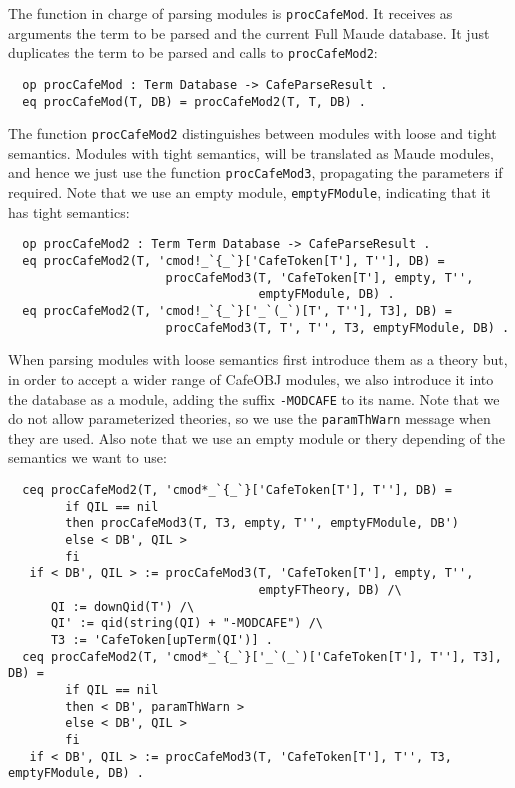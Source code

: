The function in charge of parsing modules is \verb"procCafeMod". It receives as
arguments the term to be parsed and the current Full Maude database. It just duplicates
the term to be parsed and calls to \verb"procCafeMod2":

{\codesize
\begin{verbatim}
  op procCafeMod : Term Database -> CafeParseResult .
  eq procCafeMod(T, DB) = procCafeMod2(T, T, DB) .
\end{verbatim}
}

The function \verb"procCafeMod2" distinguishes between modules with loose and
tight semantics. Modules with tight semantics, will be translated as Maude modules,
and hence we just use the function \verb"procCafeMod3", propagating the parameters
if required. Note that we use an empty module, \verb"emptyFModule", indicating that
it has tight semantics:

{\codesize
\begin{verbatim}
  op procCafeMod2 : Term Term Database -> CafeParseResult .
  eq procCafeMod2(T, 'cmod!_`{_`}['CafeToken[T'], T''], DB) =
                      procCafeMod3(T, 'CafeToken[T'], empty, T'',
                                   emptyFModule, DB) .
  eq procCafeMod2(T, 'cmod!_`{_`}['_`(_`)[T', T''], T3], DB) =
                      procCafeMod3(T, T', T'', T3, emptyFModule, DB) .
\end{verbatim}
}

When parsing modules with loose semantics first introduce them as a theory but,
in order to accept a wider range of CafeOBJ modules, we also introduce it into the
database as a module, adding the suffix \verb"-MODCAFE" to its name.
Note that we do not allow parameterized theories, so we use the \verb"paramThWarn"
message when they are used.
%
Also note that we use an empty module or thery depending of the semantics we
want to use:

{\codesize
\begin{verbatim}
  ceq procCafeMod2(T, 'cmod*_`{_`}['CafeToken[T'], T''], DB) =
        if QIL == nil
        then procCafeMod3(T, T3, empty, T'', emptyFModule, DB')
        else < DB', QIL >
        fi
   if < DB', QIL > := procCafeMod3(T, 'CafeToken[T'], empty, T'',
                                   emptyFTheory, DB) /\
      QI := downQid(T') /\
      QI' := qid(string(QI) + "-MODCAFE") /\
      T3 := 'CafeToken[upTerm(QI')] .
  ceq procCafeMod2(T, 'cmod*_`{_`}['_`(_`)['CafeToken[T'], T''], T3], DB) =
        if QIL == nil
        then < DB', paramThWarn >
        else < DB', QIL >
        fi
   if < DB', QIL > := procCafeMod3(T, 'CafeToken[T'], T'', T3, emptyFModule, DB) .
\end{verbatim}
}

